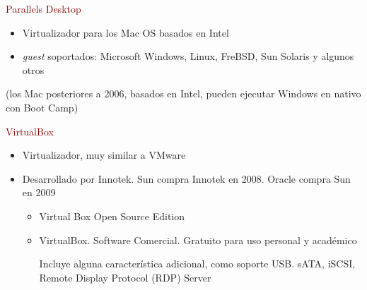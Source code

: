 \documentclass[ucs]{beamer}
\newcommand{\res}[1]{\textcolor{darkred}{#1}}
\begin{document}
\begin{frame}[fragile]

%
%
%


\res{Parallels Desktop}

\begin{itemize}	
\item
Virtualizador para los Mac OS basados en Intel
\item 
\emph{guest} soportados: Microsoft Windows, Linux, FreBSD, Sun Solaris y algunos otros
\end{itemize}

(los Mac posteriores a 2006, basados en Intel, pueden ejecutar Windows en nativo con Boot Camp)



\end{frame}



\begin{frame}[fragile]
\res{VirtualBox}
\begin{itemize}
\item
Virtualizador, muy similar a VMware
\item
Desarrollado por Innotek. Sun compra Innotek en 2008. Oracle compra Sun en 2009

\begin{itemize}
\item
Virtual Box Open Source Edition
\item
VirtualBox. Software Comercial. Gratuito para uso personal y académico

Incluye alguna característica adicional, como soporte USB. sATA, iSCSI, Remote Display Protocol (RDP) Server
\end{itemize}

\end{itemize}

\end{frame}
\end{document}
